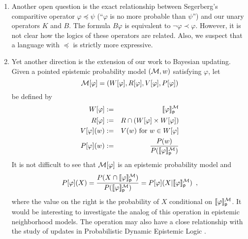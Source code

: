 \documentclass[12pt]{article}
\theoremstyle{definition}
\newcommand{\M}{{\cal M}}      %
\newcommand{\semp}[1]{\llbracket{#1}\rrbracket_{\mathsf{p}}} %
\begin{document}
\begin{enumerate}
\item Another open question is the exact relationship between
  Segerberg's comparitive operator $\varphi\preceq\psi$ (``$\varphi$
  is no more probable than $\psi$'')
  \cite{Gardenfors75,Segerberg1971:qpiams} and our unary operators $K$ and
  $B$.  The formula $B\varphi$ is equivalent to
  $\lnot\varphi\prec\varphi$.  However, it is not clear how the logics
  of these operators are related. Also, we suspect that a language
  with $\preceq$ is strictly more expressive.

\item Yet another direction is the extension of our work to Bayesian
  updating.  Given a pointed epistemic probability model $(\M,w)$
  satisfying $\varphi$, let
  \[
  \M[\varphi]=(W[\varphi],R[\varphi],V[\varphi],P[\varphi])
  \]
  be defined by
\begin{eqnarray*}
  W[\varphi] &:=& \semp{\varphi}^\M \\
  R[\varphi] &:=& R \cap (W[\varphi]\times W[\varphi]) \\
  V[\varphi](w) &:=& V(w) \text{ for } w\in W[\varphi] \\
  P[\varphi](w) &:=&
    \frac{ P(w) }{ P(\semp{\varphi}^\M) }
\end{eqnarray*}
It is not difficult to see that $\M[\varphi]$ is an epistemic probability model and
\[
P[\varphi](X) =
\frac{ P(X\cap\semp{\varphi}^\M) }{ P(\semp{\varphi}^\M) } = 
P[\varphi](X|\semp{\varphi}^\M)\enspace,
\]
where the value on the right is the probability of $X$ conditional on
$\semp{\varphi}^\M$.  It would be interesting to investigate the analog
of this operation in epistemic neighborhood models.  The operation may
also have a close relationship with the study of updates in
Probabilistic Dynamic Epistemic Logic
\cite{BenGerKoo09:SL,BalSme08:Synt}.


\end{enumerate}
\end{document}
